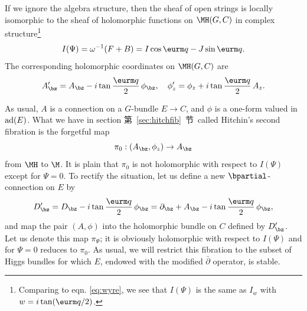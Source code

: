 If we ignore the algebra structure, then the sheaf of open strings
is locally isomorphic to the sheaf of holomorphic functions on
$\MH(G,C)$ in complex structure\footnote{Comparing to eqn. \eqref{eq:wyre}, we
see that $I(\Psi)$ is the same as $I_w$ with $w=i\tan({\eurm
q}/2)$.} %
\setcounter{equation}{31}
\begin{equation}\label{eq:muko}
I(\Psi)=\omega^{-1}(F+B)=I \cos{\eurm q} -
J\sin{\eurm q}.
\end{equation}
 The corresponding holomorphic coordinates on
$\MH(G,C)$ are %
\setcounter{equation}{32}
\begin{equation}\label{eq:suko}
A'_\bz=A_\bz - i \tan{{\eurm q}\over
2}\, \phi_\bz,\quad \phi'_z=\phi_z+i\tan{{\eurm q}\over 2}\, A_z.
\end{equation}

As usual, $A$ is a connection on a $G$-bundle $E\to C$, and $\phi$
is a one-form valued in ${\rm ad}(E)$. What we have in section
第~\ref{sec:hitchfib}~节\ called Hitchin's second fibration is the forgetful map
\setcounter{equation}{33}
\begin{equation}\label{eq:xnonko}
\pi_0: (A_\bz,\phi_z)\to A_\bz
\end{equation}
 from $\MH$ to $\M$. It
is plain that $\pi_0$ is not holomorphic with respect to $I(\Psi)$
except for $\Psi=0$. To rectify the situation, let us define a new
$\bpartial$-connection on $E$ by %
\setcounter{equation}{34}
\begin{equation}\label{eq:hoxo}
D'_\bz=D_\bz-i
\tan{{\eurm q}\over 2}\,\phi_\bz=\partial_\bz+A_\bz - i
\tan{{\eurm q}\over 2}\,\phi_\bz,
\end{equation}
 and map the pair $(A,\phi)$
into the holomorphic bundle on $C$ defined by $D'_\bz$. Let us
denote this map $\pi_\Psi$; it is obviously holomorphic with
respect to $I(\Psi)$ and for $\Psi=0$ reduces to $\pi_0$. As
usual, we will restrict this fibration to the subset of Higgs
bundles for which $E$, endowed with the modified $\bar\partial$
operator, is stable.

